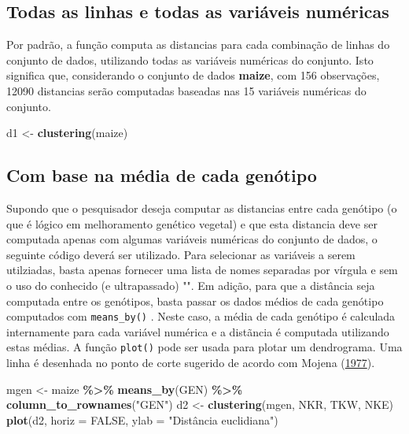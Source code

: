 \documentclass[
]{book}
\makeatletter
\newenvironment{Shaded}{\begin{snugshade}}{\end{snugshade}}
\newcommand{\DataTypeTok}[1]{\textcolor[rgb]{0.13,0.29,0.53}{#1}}
\newcommand{\KeywordTok}[1]{\textcolor[rgb]{0.13,0.29,0.53}{\textbf{#1}}}
\newcommand{\NormalTok}[1]{#1}
\newcommand{\OperatorTok}[1]{\textcolor[rgb]{0.81,0.36,0.00}{\textbf{#1}}}
\newcommand{\OtherTok}[1]{\textcolor[rgb]{0.56,0.35,0.01}{#1}}
\newcommand{\StringTok}[1]{\textcolor[rgb]{0.31,0.60,0.02}{#1}}
\numberwithin{equation}{section}
\newcommand{\indf}[1]{\index[function]{#1@\texttt{#1()}|ST}}
\makeatother
\begin{document}
\hypertarget{todas-as-linhas-e-todas-as-variuxe1veis-numuxe9ricas}{%
\subsection{Todas as linhas e todas as variáveis numéricas}\label{todas-as-linhas-e-todas-as-variuxe1veis-numuxe9ricas}}

Por padrão, a função computa as distancias para cada combinação de linhas do conjunto de dados, utilizando todas as variáveis numéricas do conjunto. Isto significa que, considerando o conjunto de dados \textbf{maize}, com 156 observações, 12090 distancias serão computadas baseadas nas 15 variáveis numéricas do conjunto.

\begin{Shaded}
\begin{Highlighting}[]
\NormalTok{d1 \textless{}{-}}\StringTok{ }\KeywordTok{clustering}\NormalTok{(maize)}
\end{Highlighting}
\end{Shaded}

\hypertarget{com-base-na-muxe9dia-de-cada-genuxf3tipo}{%
\subsection{Com base na média de cada genótipo}\label{com-base-na-muxe9dia-de-cada-genuxf3tipo}}

Supondo que o pesquisador deseja computar as distancias entre cada genótipo (o que é lógico em melhoramento genético vegetal) e que esta distancia deve ser computada apenas com algumas variáveis numéricas do conjunto de dados, o seguinte código deverá ser utilizado. Para selecionar as variáveis a serem utilziadas, basta apenas fornecer uma lista de nomes separadas por vírgula e sem o uso do conhecido (e ultrapassado) "". Em adição, para que a distância seja computada entre os genótipos, basta passar os dados médios de cada genótipo computados com \texttt{means\_by()} \indf{means\_by}. Neste caso, a média de cada genótipo é calculada internamente para cada variável numérica e a distãncia é computada utilizando estas médias. A função \texttt{plot()} pode ser usada para plotar um dendrograma. Uma linha é desenhada no ponto de corte sugerido de acordo com Mojena (\protect\hyperlink{ref-Mojena1977}{1977}).

\begin{Shaded}
\begin{Highlighting}[]
\NormalTok{mgen \textless{}{-}}\StringTok{ }
\StringTok{  }\NormalTok{maize }\OperatorTok{\%\textgreater{}\%}\StringTok{ }
\StringTok{  }\KeywordTok{means\_by}\NormalTok{(GEN) }\OperatorTok{\%\textgreater{}\%}\StringTok{ }
\StringTok{  }\KeywordTok{column\_to\_rownames}\NormalTok{(}\StringTok{"GEN"}\NormalTok{)}
\NormalTok{d2 \textless{}{-}}\StringTok{ }\KeywordTok{clustering}\NormalTok{(mgen, NKR, TKW, NKE)}
\KeywordTok{plot}\NormalTok{(d2, }\DataTypeTok{horiz =} \OtherTok{FALSE}\NormalTok{, }\DataTypeTok{ylab =} \StringTok{"Distância euclidiana"}\NormalTok{)}
\end{Highlighting}
\end{Shaded}
\end{document}
